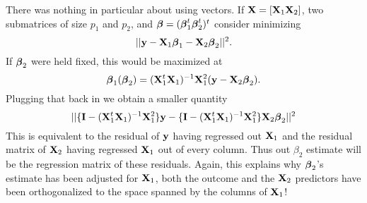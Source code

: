 There was nothing in particular about using vectors.
If $\mathbf{X} = [\mathbf{X}_1 \mathbf{X}_2]$, two submatrices of size
$p_1$ and $p_2$, and $\boldsymbol{\beta} = (\boldsymbol{\beta}_1^t \boldsymbol{\beta}_2^t)^t$ consider minimizing  
$$
|| \mathbf{y} - \mathbf{X}_1 \boldsymbol{\beta}_1 - \mathbf{X}_2 \boldsymbol{\beta}_2||^2.
$$
If $\boldsymbol{\beta}_2$ were held fixed, this would be maximized
at 
$$
\boldsymbol{\beta}_1(\boldsymbol{\beta}_2) = 
(\mathbf{X}_1^t \mathbf{X}_1)^{-1} \mathbf{X}_1^2 (\mathbf{y} - \mathbf{X}_2 \boldsymbol{\beta}_2).
$$
Plugging that back in we obtain a smaller quantity
$$
||\{\mathbf{I} - (\mathbf{X}_1^t \mathbf{X}_1)^{-1} \mathbf{X}_1^2\} \mathbf{y}
- \{\mathbf{I} - (\mathbf{X}_1^t \mathbf{X}_1)^{-1} \mathbf{X}_1^2 \}\mathbf{X}_2 \boldsymbol{\beta}_2
||^2
$$
This is equivalent to the residual of $\mathbf{y}$ having
regressed out $\mathbf{X}_1$ and the residual matrix of
$\mathbf{X}_2$ having regressed $\mathbf{X}_1$ out of every column.
Thus out $\beta_2$ estimate will be the regression
matrix of these residuals. Again, this explains
why $\boldsymbol{\beta}_2$'s estimate has been adjusted for
$\mathbf{X}_1$, both the outcome and the $\mathbf{X}_2$ predictors
have been orthogonalized to the space spanned
by the columns of $\mathbf{X}_1$!













